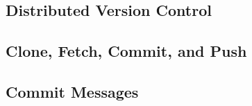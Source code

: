 \subsection{Distributed Version Control}
\begin{frame}{\insertsubsection}
	\slideDistributedVC
\end{frame}


\subsection{Clone, Fetch, Commit, and Push}
\slideCloneFetch

\slideCommitPush

\subsection{Commit Messages}

